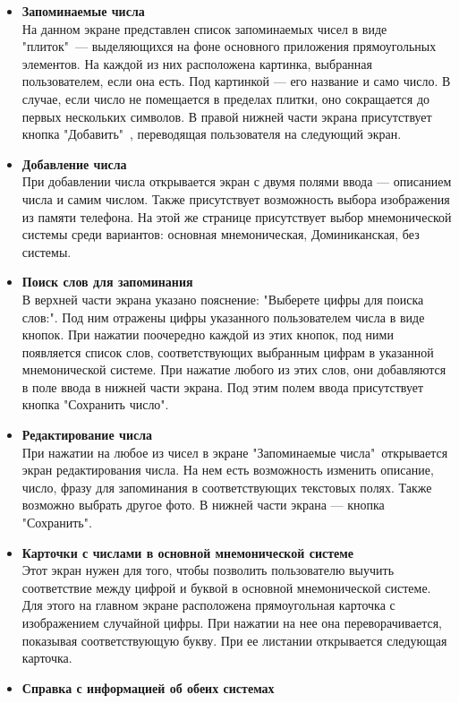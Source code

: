 \documentclass[draft]{article}
\begin{document}
\begin{itemize}
\item \textbf{Запоминаемые числа}\\
На данном экране представлен список запоминаемых чисел в виде "{}плиток"{}\ — выделяющихся на фоне основного приложения прямоугольных элементов. На каждой из них расположена картинка, выбранная пользователем, если она есть. Под картинкой — его название и само число. В случае, если число не помещается в пределах плитки, оно сокращается до первых нескольких символов. В правой нижней части экрана присутствует кнопка "{}Добавить"{}\ , переводящая пользователя на следующий экран.
\item \textbf{Добавление числа}\\
При добавлении числа открывается экран с двумя полями ввода — описанием числа и самим числом. Также присутствует возможность выбора изображения из памяти телефона. На этой же странице присутствует выбор мнемонической системы среди вариантов: основная мнемоническая, Доминиканская, без системы.
\item \textbf{Поиск слов для запоминания}\\
В верхней части экрана указано пояснение: "{}Выберете цифры для поиска слов:"{}. Под ним отражены цифры указанного пользователем числа в виде кнопок. При нажатии поочередно каждой из этих кнопок, под ними появляется список слов, соответствующих выбранным цифрам в указанной мнемонической системе. При нажатие любого из этих слов, они добавляются в поле ввода в нижней части экрана. Под этим полем ввода присутствует кнопка "{}Сохранить число"{}.
\item \textbf{Редактирование числа}\\
При нажатии на любое из чисел в экране "{}Запоминаемые числа"{}\ открывается экран редактирования числа. На нем есть возможность изменить описание, число, фразу для запоминания в соответствующих текстовых полях. Также возможно выбрать другое фото. В нижней части экрана — кнопка "{}Сохранить"{}.
\item \textbf{Карточки с числами в основной мнемонической системе}\\
Этот экран нужен для того, чтобы позволить пользователю выучить соответствие между цифрой и буквой в основной мнемонической системе. Для этого на главном экране расположена прямоугольная карточка с изображением случайной цифры. При нажатии на нее она переворачивается, показывая соответствующую букву. При ее листании открывается следующая карточка.
\item \textbf{Справка с информацией об обеих системах}\\

\end{itemize}
\end{document}
